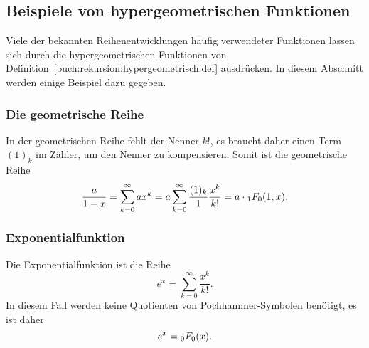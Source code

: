 \subsection{Beispiele von hypergeometrischen Funktionen
\label{buch:rekursion:hypergeometrisch:beispiele}}
Viele der bekannten Reihenentwicklungen häufig verwendeter Funktionen
lassen sich durch die hypergeometrischen Funktionen von
Definition~\ref{buch:rekursion:hypergeometrisch:def} ausdrücken.
In diesem Abschnitt werden einige Beispiel dazu gegeben.

\subsubsection{Die geometrische Reihe}
In der geometrischen Reihe fehlt der Nenner $k!$, es braucht
daher einen Term $(1)_k$ im Zähler, um den Nenner zu kompensieren.
Somit ist die geometrische Reihe
\[
\frac{a}{1-x}
=
\sum_{k=0}^\infty
ax^k
=
a\sum_{k=0}^\infty
\frac{(1)_k}{1}
\frac{x^k}{k!}
=
a\cdot\mathstrut_1F_0(1,x).
\]

\subsubsection{Exponentialfunktion}
Die Exponentialfunktion ist die Reihe
\[
e^x = \sum_{k=0}^\infty \frac{x^k}{k!}.
\]
In diesem Fall werden keine Quotienten von Pochhammer-Symbolen
benötigt, es ist daher
\[
e^x = \mathstrut_0F_0(x).
\]


